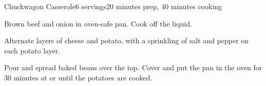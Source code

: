 \documentclass[../Cookbook.tex]{subfiles}
\begin{document}
\begin{recipe}{Chuckwagon Casserole}{6 servings}{20 minutes prep, 40 minutes cooking}


Brown beef and onion in oven-safe pan. Cook off the liquid.

Alternate layers of cheese and potato, with a sprinkling of salt and pepper on each potato layer.

Pour and spread baked beans over the top. Cover and put the pan in the oven for 30 minutes at  or until the potatoes are cooked.

\end{recipe}
\end{document}
